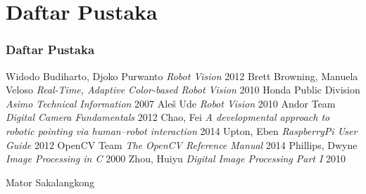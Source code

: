 \documentclass[table,dvipsnames]{beamer}
\begin{document}
\section{Daftar Pustaka}
% 
\begin{frame}
\frametitle{Daftar Pustaka}
\footnotesize{
\begin{thebibliography}{99}
 Widodo Budiharto, Djoko Purwanto \textit{Robot Vision} 2012
 Brett Browning, Manuela Veloso \textit{Real-Time, Adaptive Color-based Robot Vision} 2010
 Honda Public Division \textit{Asimo Technical Information} 2007
 Aleš Ude \textit{Robot Vision} 2010
 Andor Team \textit{Digital Camera Fundamentals} 2012
 Chao, Fei \textit{A developmental approach to robotic pointing via human–robot interaction} 2014
 Upton, Eben \textit{RaspberryPi User Guide} 2012
 OpenCV Team \textit{The OpenCV Reference Manual} 2014
 Phillips, Dwyne \textit{Image Processing in C} 2000
 Zhou, Huiyu \textit{Digital Image Processing Part I} 2010
\end{thebibliography}
}
\end{frame}


\begin{frame}
\Huge{\centerline{Mator Sakalangkong}}
\end{frame}
\end{document}
